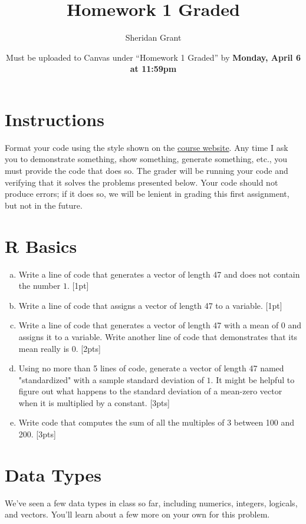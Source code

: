 \documentclass[12pt]{article}
\title{Homework 1 Graded}
\author{Sheridan Grant}
\date{Must be uploaded to Canvas under ``Homework 1 Graded'' by \textbf{Monday, April 6 at 11:59pm}}
\begin{document}
\sloppy
	
	\maketitle
	
	\section*{Instructions}
	
	Format your code using the style shown on the \href{https://sheridanlgrant.github.io/teaching/STAT302_SPR2020}{course website}. Any time I ask you to demonstrate something, show something, generate something, etc., you must provide the code that does so. The grader will be running your code and verifying that it solves the problems presented below. Your code should not produce errors; if it does so, we will be lenient in grading this first assignment, but not in the future.
	
	\section{R Basics}
	
	\begin{enumerate}[(a)]
		\item Write a line of code that generates a vector of length 47 and does not contain the number $1$. [1pt]
		\item Write a line of code that assigns a vector of length 47 to a variable. [1pt]
		\item Write a line of code that generates a vector of length 47 with a mean of $0$ and assigns it to a variable. Write another line of code that demonstrates that its mean really is $0$. [2pts]
		\item Using no more than 5 lines of code, generate a vector of length 47 named "standardized" with a sample standard deviation of $1$. It might be helpful to figure out what happens to the standard deviation of a mean-zero vector when it is multiplied by a constant. [3pts]
		\item Write code that computes the sum of all the multiples of $3$ between 100 and 200. [3pts]
	\end{enumerate}
	
	\section{Data Types}
	
	We've seen a few data types in class so far, including numerics, integers, logicals, and vectors. You'll learn about a few more on your own for this problem.
	
\end{document}
